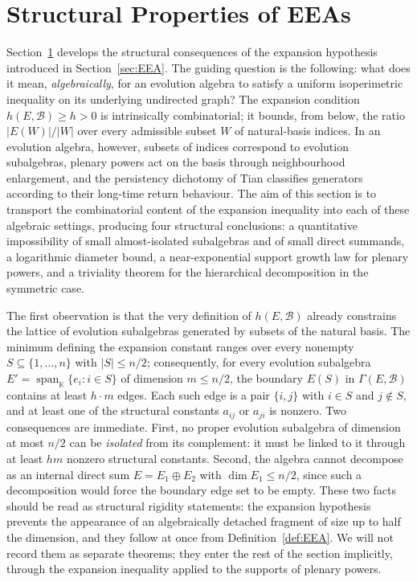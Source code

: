 \documentclass[12pt,a4paper]{amsart}
\theoremstyle{definition}
\DeclareMathOperator{\Span}{span}
\newcommand{\K}{\mathbb{K}}
\newcommand{\hh}{h}          %
\newcommand{\EA}{E}          %
\newcommand{\natbasis}{\mathcal{B}}  %
\begin{document}
\section{Structural Properties of EEAs}\label{sec:structure}

Section~\ref{sec:structure} develops the structural consequences of
the expansion hypothesis introduced in
Section~\ref{sec:EEA}.  The guiding question is the following: what
does it mean, \emph{algebraically}, for an evolution algebra to satisfy
a uniform isoperimetric inequality on its underlying undirected graph?
The expansion condition $\hh(\EA,\natbasis)\ge h>0$ is intrinsically
combinatorial; it bounds, from below, the ratio $|E(W)|/|W|$ over every
admissible subset $W$ of natural-basis indices.  In an evolution
algebra, however, subsets of indices correspond to evolution
subalgebras, plenary powers act on the basis through neighbourhood
enlargement, and the persistency dichotomy of Tian
\cite{Tian2008} classifies generators according to their long-time
return behaviour.  The aim of this section is to transport the
combinatorial content of the expansion inequality into each of these
algebraic settings, producing four structural conclusions: a
quantitative impossibility of small almost-isolated subalgebras and of
small direct summands, a logarithmic diameter bound, a near-exponential
support growth law for plenary powers, and a triviality theorem for
the hierarchical decomposition in the symmetric case.

\medskip
The first observation is that the very definition of $\hh(\EA,
\natbasis)$ already constrains the lattice of evolution subalgebras
generated by subsets of the natural basis.  The minimum defining the
expansion constant ranges over every nonempty
$S\subseteq\{1,\ldots,n\}$ with $|S|\le n/2$; consequently, for every
evolution subalgebra $\EA'=\Span_{\K}\{e_i:i\in S\}$ of dimension
$m\le n/2$, the boundary $E(S)$ in $\varGamma(\EA,\natbasis)$ contains
at least $h\cdot m$ edges.  Each such edge is a pair $\{i,j\}$ with
$i\in S$ and $j\notin S$, and at least one of the structural constants
$a_{ij}$ or $a_{ji}$ is nonzero.  Two consequences are immediate.
First, no proper evolution subalgebra of dimension at most $n/2$ can
be \emph{isolated} from its complement: it must be linked to it
through at least $hm$ nonzero structural constants.  Second, the
algebra cannot decompose as an internal direct sum $\EA=\EA_1\oplus
\EA_2$ with $\dim\EA_1\le n/2$, since such a decomposition would force
the boundary edge set to be empty.  These two facts should be read as
structural rigidity statements: the expansion hypothesis prevents the
appearance of an algebraically detached fragment of size up to half
the dimension, and they follow at once from
Definition~\ref{def:EEA}.  We will not record them as separate
theorems; they enter the rest of the section implicitly, through the
expansion inequality applied to the supports of plenary powers.
\end{document}
